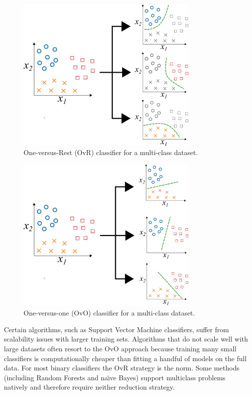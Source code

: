 \documentclass[12pt,letter]{article}
\begin{document}
\begin{figure}[H]
    \centering
    \includegraphics[width=3.5in]{../figures/one_vs_rest}
    \caption{One-versus-Rest (OvR) classifier for a multi-class dataset.}
    \label{fig:one_vs_rest}
\end{figure}

\begin{figure}[H]
    \centering
    \includegraphics[width=3.5in]{../figures/one_vs_one}
    \caption{One-versus-one (OvO) classifier for a multi-class dataset.}
    \label{fig:one_vs_one}
\end{figure}

Certain algorithms, such as Support Vector Machine classifiers, suffer from scalability issues with larger training sets. Algorithms that do not scale well with large datasets often resort to the OvO approach because training many small classifiers is computationally cheaper than fitting a handful of models on the full data. For most binary classifiers the OvR strategy is the norm. Some methods (including Random Forests and na\"{\i}ve Bayes) support multiclass problems natively and therefore require neither reduction strategy.
\end{document}
